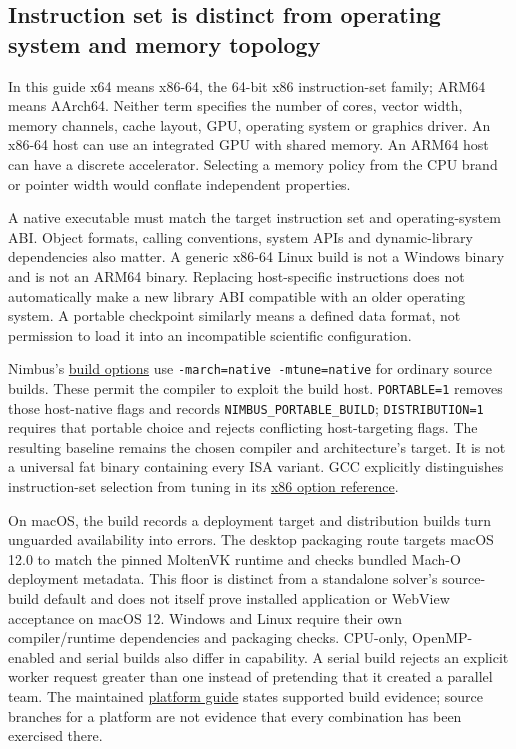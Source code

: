 \subsection{Instruction set is distinct from operating system and memory topology}

In this guide x64 means x86-64, the 64-bit x86 instruction-set family; ARM64
means AArch64. Neither term specifies the number of cores, vector width,
memory channels, cache layout, GPU, operating system or graphics driver.
An x86-64 host can use an integrated GPU with shared memory. An ARM64 host can
have a discrete accelerator. Selecting a memory policy from the CPU brand or
pointer width would conflate independent properties.

A native executable must match the target instruction set and operating-system
ABI. Object formats, calling conventions, system APIs and dynamic-library
dependencies also matter. A generic x86-64 Linux build is not a Windows binary
and is not an ARM64 binary. Replacing host-specific instructions does not
automatically make a new library ABI compatible with an older operating
system. A portable checkpoint similarly means a defined data format, not
permission to load it into an incompatible scientific configuration.

Nimbus's \href{../mk/options.mk}{build options} use
\texttt{-march=native -mtune=native} for ordinary source builds. These permit
the compiler to exploit the build host. \texttt{PORTABLE=1} removes those
host-native flags and records \texttt{NIMBUS\_PORTABLE\_BUILD};
\texttt{DISTRIBUTION=1} requires that portable choice and rejects conflicting
host-targeting flags. The resulting baseline remains the chosen compiler and
architecture's target. It is not a universal fat binary containing every ISA
variant. GCC explicitly distinguishes instruction-set selection from tuning
in its \href{https://gcc.gnu.org/onlinedocs/gcc/x86-Options.html}{x86 option
reference}.

On macOS, the build records a deployment target and distribution builds turn
unguarded availability into errors. The desktop packaging route targets macOS
12.0 to match the pinned MoltenVK runtime and checks bundled Mach-O deployment
metadata. This floor is distinct from a standalone solver's source-build
default and does not itself prove installed application or WebView acceptance
on macOS 12. Windows and Linux require their own
compiler/runtime dependencies and packaging checks. CPU-only, OpenMP-enabled
and serial builds also differ in capability. A serial build rejects an
explicit worker request greater than one instead of pretending that it
created a parallel team. The maintained
\href{SUPPORTED_PLATFORMS.md}{platform guide} states supported build evidence;
source branches for a platform are not evidence that every combination has
been exercised there.

